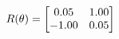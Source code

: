 \documentclass[preview]{standalone}
\begin{document}
\begin{align*}
\special{dvisvgm:raw <g id='unique000'>}R(\theta) = \begin{bmatrix}0.05 & 1.00\\-1.00 & 0.05\end{bmatrix}\special{dvisvgm:raw </g>}
\end{align*}
\end{document}
